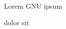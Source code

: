 \documentclass{article}
\begin{document}
Lorem
\gls{GNU}
ipsum

dolor
\printacronyms
sit
\end{document}
